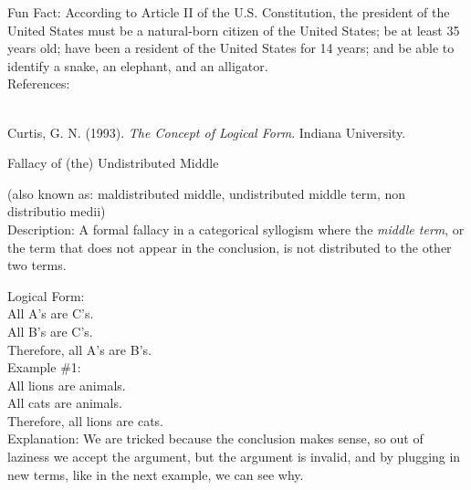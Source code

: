 \documentclass[a4paper,12pt,single,pdftex]{scrartcl}
\begin{document}
    
      Fun Fact: According to Article II of the U.S. Constitution, the president of the United States must be a natural-born citizen of the United States; be at least 35 years old; have been a resident of the United States for 14 years; and be able to identify a snake, an elephant, and an alligator.
    \\

    References:

    
      
        
      \\

      
        
          Curtis, G. N. (1993). {\it The Concept of Logical Form}. Indiana University.
        
      
    
  

Fallacy of (the) Undistributed Middle
    
      (also known as: maldistributed middle, undistributed middle term, non distributio medii)
    \\

  
    Description: A formal fallacy in a categorical syllogism where the {\it middle term}, or the term that does not appear in the conclusion, is not distributed to the other two terms.

    
      Logical Form:
    \\

    
      All A's are C's.
    \\

    
      All B's are C's.
    \\

    
      Therefore, all A’s are B’s.
    \\

    
      Example \#1:
    \\

    
      All lions are animals.
    \\

    
      All cats are animals.
    \\

    
      Therefore, all lions are cats.
    \\

    
      Explanation: We are tricked because the conclusion makes sense, so out of laziness we accept the argument, but the argument is invalid, and by plugging in new terms, like in the next example, we can see why.
    \\
\end{document}
